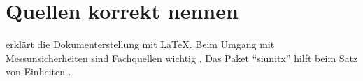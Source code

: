 \documentclass{scrartcl}
\begin{document}
\section{Quellen korrekt nennen}
\textcite{lamport1994} erklärt die
Dokumenterstellung mit LaTeX.
Beim Umgang mit Messunsicherheiten sind
Fachquellen wichtig \parencite{jcgm2008}.
Das Paket \enquote{siunitx} hilft beim
Satz von Einheiten \parencite{siunitx_ctan}.
\printbibliography[heading=bibintoc,title={Quellenverzeichnis}]
\end{document}
